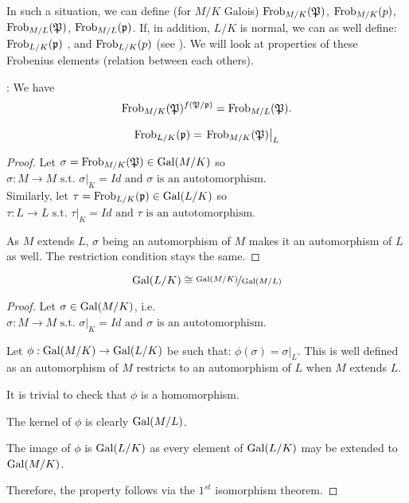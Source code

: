 In such a situation, we can define (for $M/K$ Galois)
$\text{Frob}_{M/K}(\mathfrak{P})$, 
$\text{Frob}_{M/K}(p)$, 
$\text{Frob}_{M/L}(\mathfrak{P})$, 
$\text{Frob}_{M/L}(\mathfrak{p})$.
If, in addition, $L/K$ is normal, we can as well define:
$\text{Frob}_{L/K}(\mathfrak{p})$ , and 
$\text{Frob}_{L/K}(p)$ (see \cite[p.99]{AlgebraicNumberFields}).
We will look at properties of these Frobenius elements (relation between each others).

\begin{property}\cite[p.99]{AlgebraicNumberFields}:
	We have 
	$$
	\text{Frob}_{M/K}(\mathfrak{P})^{f(\mathfrak{P}/\mathfrak{p})} = \text{Frob}_{M/L}(\mathfrak{P}).
	$$
\end{property}

\begin{property}
	$$
	\text{Frob}_{L/K}(\mathfrak{p}) = \left. \text{Frob}_{M/K}(\mathfrak{P}) \right|_L
	$$
\end{property}
\begin{proof}
	Let $\sigma = \text{Frob}_{M/K}(\mathfrak{P}) \in \text{Gal}(M/K)$ so 
	$\sigma: M \to M \text{ s.t. } \left. \sigma \right|_K = Id \text{ and } \sigma \text{ is an autotomorphism}$.\\
	Similarly, let $\tau = \text{Frob}_{L/K}(\mathfrak{p}) \in \text{Gal}(L/K)$ so 
	$\tau: L \to L \text{ s.t. } \left. \tau \right|_K = Id \text{ and } \tau \text{ is an autotomorphism}$.
	
	As $M$ extends $L$, $\sigma$ being an automorphism of $M$ makes it an automorphism of $L$ as well.
	The restriction condition stays the same.
\end{proof}


\begin{property}
	$$
	\text{Gal}(L/K) \cong \nicefrac{\text{Gal}(M/K)}{\text{Gal}(M/L)}
	$$
\end{property}
\begin{proof}
	Let $\sigma \in \text{Gal}(M/K)$, i.e. $\sigma: M \to M \text{ s.t. } \left. \sigma \right|_K = Id \text{ and } \sigma \text{ is an autotomorphism}$.
	
	Let $\phi: \text{Gal}(M/K) \to \text{Gal}(L/K)$ be such that:
	$\phi(\sigma) = \left. \sigma \right|_L$.
	This is well defined as an automorphism of $M$ restricts to an automorphism of $L$ when $M$ extends $L$.
	
	It is trivial to check that $\phi$ is a homomorphism.
	
	The kernel of $\phi$ is clearly $\text{Gal}(M/L)$.
	
	The image of $\phi$ is $\text{Gal}(L/K)$ as every element of $\text{Gal}(L/K)$ may be extended to $\text{Gal}(M/K)$.
	
	Therefore, the property follows via the $1^{st}$ isomorphism theorem.
\end{proof}


